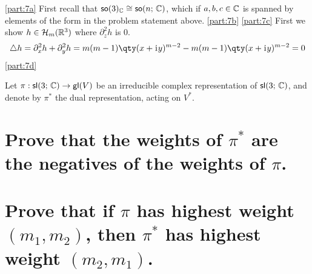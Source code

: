 \documentclass[
	pages,
	boxes,
	color=WildStrawberry
]{homework}
\begin{document}
\begin{solution}
	\ref{part:7a}
	First recall that $\mathsf{so}(3)_{\mathbb{C}}\cong \mathsf{so}(n;\,\mathbb{C})$, which if $a, b, c\in\mathbb{C}$ is spanned by elements of the form in the problem statement above.
	\ref{part:7b}
	\ref{part:7c}
	First we show $h\in\mathcal{H}_m(\mathbb{R}^3)$ where $\partial_z^2 h$ is 0.
	\begin{equation*}
		\laplace{h} = \partial_x^2 h + \partial_y^2 h = m(m-1)\qty(x + \iu y)^{m-2} - m(m-1)\qty(x + \iu y)^{m-2} = 0
	\end{equation*}
	\ref{part:7d}
\end{solution}

\begin{problem}
Let $\pi: \mathsf{sl}(3;\, \mathbb{C}) \to \mathsf{gl}(V)$ be an irreducible complex representation of $\mathsf{sl}(3;\, \mathbb{C})$, and denote by $\pi^*$ the dual representation, acting on $V^*$.
\begin{parts}
	\part{Prove that the weights of $\pi^*$ are the negatives of the weights of $\pi$.}
	\part{Prove that if $\pi$ has highest weight $(m_1, m_2)$, then $\pi^*$ has highest weight $(m_2, m_1)$.}
\end{parts}
\end{problem}

\begin{solution}
\end{solution}
\end{document}
